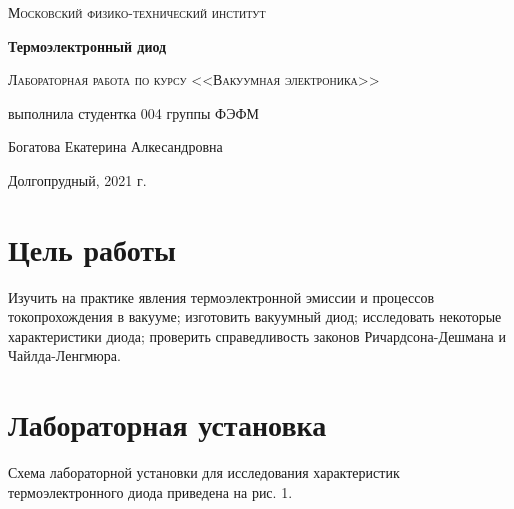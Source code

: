 \documentclass[a4paper]{article}
\begin{document}
\begin{titlepage}
	\centering
	\vspace{5cm}
	{\scshape\LARGE Московский физико-технический институт \par}
	\vspace{5cm}

	{\huge\bfseries Термоэлектронный диод \par}
	\vspace{1cm}
	{\scshape\Large Лабораторная работа по курсу <<Вакуумная электроника>>\par}
	\vspace{1cm}
	\vfill
\begin{flushright}
	{\large выполнила студентка 004 группы ФЭФМ}\par
	\vspace{0.3cm}
	{\LARGE Богатова Екатерина Алкесандровна} \par

	
\end{flushright}
	

	\vfill

	Долгопрудный, 2021 г.
\end{titlepage}

\section{Цель работы}
Изучить на практике явления термоэлектронной эмиссии и процессов токопрохождения в вакууме; изготовить вакуумный диод; исследовать некоторые характеристики диода; проверить справедливость законов Ричардсона-Дешмана и Чайлда-Ленгмюра.

\section{Лабораторная установка}
Схема лабораторной установки для исследования характеристик термоэлектронного диода приведена на рис. 1.
\end{document}
